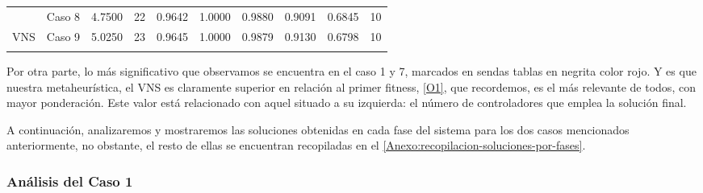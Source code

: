 \begin{table}[]
{\begin{tabular}{cccccccccc}
			\multicolumn{1}{c|}{}                      & {\color[HTML]{003532} Caso 8} & {\color[HTML]{003532} 4.7500}                                        & {\color[HTML]{003532} 22}                                          & {\color[HTML]{003532} 0.9642}                           & {\color[HTML]{003532} 1.0000} & {\color[HTML]{003532} 0.9880} & {\color[HTML]{003532} 0.9091} & {\color[HTML]{003532} 0.6845} & {\color[HTML]{003532} 10}                                            \\
			\multicolumn{1}{c|}{\multirow{-8}{*}{VNS}} & Caso 9                        & 5.0250                                                               & 23                                                                 & 0.9645                                                  & 1.0000                        & 0.9879                        & 0.9130                        & 0.6798                        & 10                                                                   \\
			\multicolumn{10}{c}{}                                                                                                                                                                                                                                                                                                                                                                                                                                                                   \\ \hline
		\end{tabular}%
	}
\end{table}

Por otra parte, lo más significativo que observamos se encuentra en el caso 1 y 7, marcados en sendas tablas en negrita color rojo. Y es que nuestra metaheurística, el VNS es claramente superior en relación al primer fitness, \ref{O1}, que recordemos, es el más relevante de todos, con mayor ponderación. Este valor está relacionado con aquel situado a su izquierda: el número de controladores que emplea la solución final. 

A continuación, analizaremos y mostraremos las soluciones obtenidas en cada fase del sistema para los dos casos mencionados anteriormente, no obstante, el resto de ellas se encuentran recopiladas en el \autoref{Anexo:recopilacion-soluciones-por-fases}.

\subsubsection{Análisis del Caso 1}

